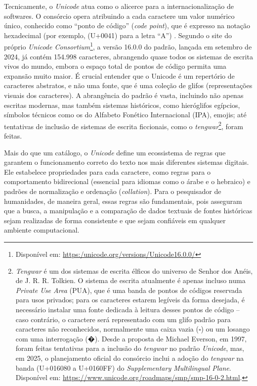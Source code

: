 \documentclass[portuguese]{textolivre}
\newcommand{\unicodeerror}{{\notofont �}}
\begin{document}
Tecnicamente, o \textit{Unicode} atua como o alicerce para a internacionalização de softwares. O consórcio opera atribuindo a cada caractere um valor numérico único, conhecido como “ponto de código” (\textit{code point}), que é expresso na notação hexadecimal (por exemplo, (U+0041) para a letra “A”) \cite{spolsky2003unicode}. Segundo o site do próprio \textit{Unicode Consortium}\footnote{Disponível em: \url{https:/unicode.org/versions/Unicode16.0.0/}}, a versão 16.0.0 do padrão, lançada em setembro de 2024, já contém 154.998 caracteres, abrangendo quase todos os sistemas de escrita vivos do mundo, embora o espaço total de pontos de código permita uma expansão muito maior. É crucial entender que o Unicode é um repertório de caracteres abstratos, e não uma fonte, que é uma coleção de glifos (representações visuais dos caracteres). A abrangência do padrão é vasta, incluindo não apenas escritas modernas, mas também sistemas históricos, como hieróglifos egípcios, símbolos técnicos como os do Alfabeto Fonético Internacional (IPA), emojis; até tentativas de inclusão de sistemas de escrita ficcionais, como o \textit{tengwar}\footnote{\textit{Tengwar} é um dos sistemas de escrita élficos do universo de Senhor dos Anéis, de J. R. R. Tolkien. O sistema de escrita atualmente é apenas incluso numa \textit{Private Use Area} (PUA), que é uma banda de pontos de códigos reservada para usos privados; para os caracteres estarem legíveis da forma desejada, é necessário instalar uma fonte dedicada à leitura desses pontos de código – caso contrário, o caractere será representado com um glifo padrão para caracteres não reconhecidos, normalmente uma caixa vazia ($\square$) ou um losango com uma interrogação (\unicodeerror{}). Desde a proposta de Michael Everson, em 1997, foram feitas tentativas para a inclusão do \textit{tengwar} no padrão \textit{Unicode}, mas, em 2025, o planejamento oficial do consórcio inclui a adoção do \textit{tengwar} na banda (U+016080 a U+0160FF) do \textit{Supplementary Multilingual Plane}. Disponível em: \url{https://www.unicode.org/roadmaps/smp/smp-16-0-2.html}.}, foram feitas.
 
Mais do que um catálogo, o \textit{Unicode} define um ecossistema de regras que garantem o funcionamento correto do texto nos mais diferentes sistemas digitais. Ele estabelece propriedades para cada caractere, como regras para o comportamento bidirecional (essencial para idiomas como o árabe e o hebraico) e padrões de normalização e ordenação (\textit{collation}). Para o pesquisador de humanidades, de maneira geral, essas regras são fundamentais, pois asseguram que a busca, a manipulação e a comparação de dados textuais de fontes históricas sejam realizadas de forma consistente e que sejam confiáveis em qualquer ambiente computacional.
\end{document}
